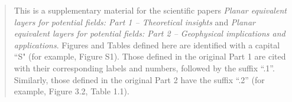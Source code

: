 \begin{abstract}
	This is a supplementary material for the scientific papers 
	\textit{Planar equivalent layers for potential fields: Part 1 -- Theoretical insights} and
	\textit{Planar equivalent layers for potential fields: Part 2 -- Geophysical implications and applications}. 
	Figures and Tables defined here are 
	identified with a capital ``S" (for example, Figure S1). 
	Those defined in the original Part 1 are cited with their corresponding labels and numbers,
	followed by the suffix ``.1''. Similarly, those defined in the original Part 2 have the suffix ``.2''
	(for example, Figure 3.2, Table 1.1).
\end{abstract}